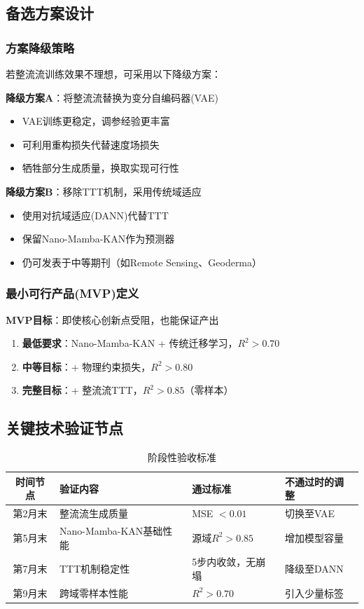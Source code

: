\documentclass[12pt, a4paper]{article}
\begin{document}
\subsection{备选方案设计}

\subsubsection{方案降级策略}
若整流流训练效果不理想，可采用以下降级方案：

\textbf{降级方案A}：将整流流替换为变分自编码器(VAE)
\begin{itemize}
    \item VAE训练更稳定，调参经验更丰富
    \item 可利用重构损失代替速度场损失
    \item 牺牲部分生成质量，换取实现可行性
\end{itemize}

\textbf{降级方案B}：移除TTT机制，采用传统域适应
\begin{itemize}
    \item 使用对抗域适应(DANN)代替TTT
    \item 保留Nano-Mamba-KAN作为预测器
    \item 仍可发表于中等期刊（如Remote Sensing、Geoderma）
\end{itemize}

\subsubsection{最小可行产品(MVP)定义}
\textbf{MVP目标}：即使核心创新点受阻，也能保证产出

\begin{enumerate}
    \item \textbf{最低要求}：Nano-Mamba-KAN + 传统迁移学习，$R^2 > 0.70$
    \item \textbf{中等目标}：+ 物理约束损失，$R^2 > 0.80$
    \item \textbf{完整目标}：+ 整流流TTT，$R^2 > 0.85$（零样本）
\end{enumerate}

\subsection{关键技术验证节点}

\begin{table}[H]
\centering
\caption{阶段性验收标准}
\begin{tabular}{clll}
\toprule
时间节点 & 验证内容 & 通过标准 & 不通过时的调整 \\
\midrule
第2月末 & 整流流生成质量 & MSE $< 0.01$ & 切换至VAE \\
第5月末 & Nano-Mamba-KAN基础性能 & 源域$R^2 > 0.85$ & 增加模型容量 \\
第7月末 & TTT机制稳定性 & 5步内收敛，无崩塌 & 降级至DANN \\
第9月末 & 跨域零样本性能 & $R^2 > 0.70$ & 引入少量标签 \\
\bottomrule
\end{tabular}
\end{table}
\end{document}
